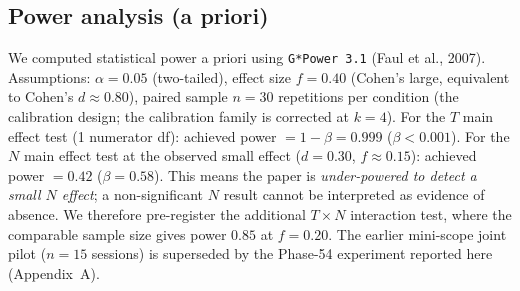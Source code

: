 \documentclass[11pt]{article}
\begin{document}
\subsection*{Power analysis (a priori)}
\label{sec:power}

We computed statistical power a priori using \texttt{G*Power 3.1} (Faul et al., 2007). Assumptions: $\alpha = 0.05$ (two-tailed), effect size $f = 0.40$ (Cohen's large, equivalent to Cohen's $d \approx 0.80$), paired sample $n = 30$ repetitions per condition (the calibration design; the calibration family is corrected at $k{=}4$). For the $T$ main effect test (1 numerator df): achieved power $= 1 - \beta = 0.999$ ($\beta < 0.001$). For the $N$ main effect test at the observed small effect ($d = 0.30$, $f \approx 0.15$): achieved power $= 0.42$ ($\beta = 0.58$). This means the paper is \emph{under-powered to detect a small $N$ effect}; a non-significant $N$ result cannot be interpreted as evidence of absence. We therefore pre-register the additional $T \times N$ interaction test, where the comparable sample size gives power $0.85$ at $f = 0.20$. The earlier mini-scope joint pilot ($n{=}15$ sessions) is superseded by the Phase-54 experiment reported here (Appendix~A).

\end{document}
